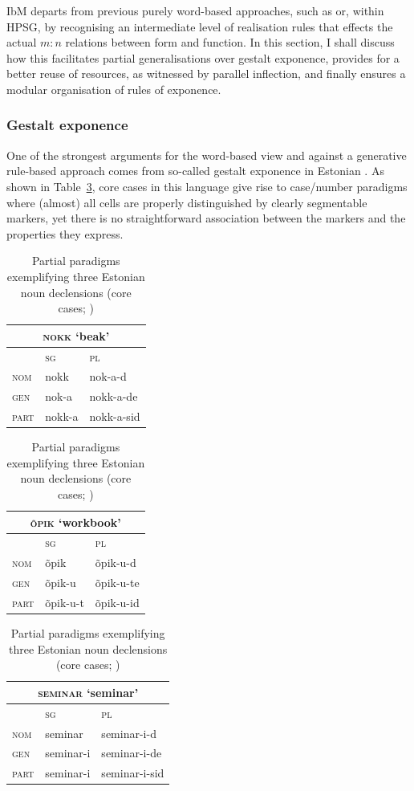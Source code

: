 \documentclass[output=paper
                ,modfonts
                ,nonflat
	        ,collection
	        ,collectionchapter
	        ,collectiontoclongg
 	        ,biblatex
                ,babelshorthands
                ,newtxmath
                ,draftmode
                ,colorlinks, citecolor=brown
] {langscibook}
\begin{document}
{IbM departs from previous purely word-based approaches, such as
\citet{Blevins14} or, within HPSG, \citet{Koenig99} by recognising an
intermediate level of realisation rules that effects the actual $m:n$
relations between form and function. In this section, I shall discuss
how this facilitates partial generalisations over gestalt exponence,
provides for a better reuse of resources, as witnessed by parallel
inflection, and finally ensures a modular organisation of rules of
exponence.

\subsubsection{Gestalt exponence}

One of the strongest arguments for the word-based view and against a
generative rule-based approach comes from so-called gestalt exponence
in Estonian \citep{Blevins05}. As shown in Table~\ref{tab:Estonian},
core cases in this language give rise to case/number paradigms where
(almost) all cells are properly distinguished by clearly segmentable
markers, yet there is no straightforward association between the
markers and the properties they express.   


\begin{table}[htbp]
  \small
  \setlength{\tabcolsep}{.7\tabcolsep}
\begin{tabular}{lll}
 \multicolumn{3}{c}{\textsc{nokk} `beak'} \\
\toprule
  & \textsc{sg} & \textsc{pl}  \\
  \midrule
  \textsc{nom} & nokk & nok-a-d \\
  \textsc{gen} & nok-a & nokk-a-de\\
  \textsc{part} & nokk-a & nokk-a-sid\\
\bottomrule
\end{tabular}
\medskip
\begin{tabular}{lll} 
\multicolumn{3}{c}{\textsc{õpik} `workbook'}\\
\toprule
  & \textsc{sg} & \textsc{pl}  \\
  \midrule
  \textsc{nom}  & õpik & õpik-u-d\\
  \textsc{gen}  & õpik-u & õpik-u-te\\
  \textsc{part} & õpik-u-t & õpik-u-id \\
\bottomrule
\end{tabular}

\begin{tabular}{lll} 
\multicolumn{3}{c}{\textsc{seminar} `seminar'}\\
\toprule
  & \textsc{sg} & \textsc{pl}\\
  \midrule
  \textsc{nom}  & seminar & seminar-i-d\\
  \textsc{gen}  & seminar-i & seminar-i-de\\
  \textsc{part} & seminar-i & seminar-i-sid \\
\bottomrule
\end{tabular}
\hfill
  \caption{Partial paradigms exemplifying three Estonian noun declensions (core cases; \citealp{Blevins05})}
\label{tab:Estonian}
\end{table}

}
\end{document}
